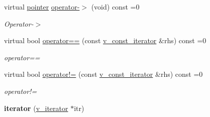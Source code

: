 \begin{DoxyCompactItemize}
\mbox{\label{group___thin_var_dep_interface___c_l_a_s_s_e_s_gab6b157ee55dad2dd8215f31aafbdd35f}} 
virtual \mbox{\hyperlink{class_s_m_spp__di__unipi__it_1_1_variable}{pointer}} \mbox{\hyperlink{group___thin_var_dep_interface___c_l_a_s_s_e_s_gab6b157ee55dad2dd8215f31aafbdd35f}{operator-\/$>$}} (void) const =0
\begin{DoxyCompactList}\small\item\em Operator-\/$>$ \end{DoxyCompactList}\item 
\mbox{\label{group___thin_var_dep_interface___c_l_a_s_s_e_s_gae057869085d3845118bd5cf033129e43}} 
virtual bool \mbox{\hyperlink{group___thin_var_dep_interface___c_l_a_s_s_e_s_gae057869085d3845118bd5cf033129e43}{operator==}} (const \mbox{\hyperlink{class_s_m_spp__di__unipi__it_1_1_thin_var_dep_interface_1_1v__const__iterator}{v\+\_\+const\+\_\+iterator}} \&rhs) const =0
\begin{DoxyCompactList}\small\item\em operator== \end{DoxyCompactList}\item 
\mbox{\label{group___thin_var_dep_interface___c_l_a_s_s_e_s_ga042a02e36885666d678408d678b499e7}} 
virtual bool \mbox{\hyperlink{group___thin_var_dep_interface___c_l_a_s_s_e_s_ga042a02e36885666d678408d678b499e7}{operator!=}} (const \mbox{\hyperlink{class_s_m_spp__di__unipi__it_1_1_thin_var_dep_interface_1_1v__const__iterator}{v\+\_\+const\+\_\+iterator}} \&rhs) const =0
\begin{DoxyCompactList}\small\item\em operator!= \end{DoxyCompactList}\item 
\mbox{\label{group___thin_var_dep_interface___c_l_a_s_s_e_s_ga772b10a992e1112b028069f463bd0a0f}} 
{\bfseries iterator} (\mbox{\hyperlink{class_s_m_spp__di__unipi__it_1_1_thin_var_dep_interface_1_1v__iterator}{v\+\_\+iterator}} $\ast$itr)
\item 
\mbox{\label{group___thin_var_dep_interface___c_l_a_s_s_e_s_gac476d3d079ac23a2fe8f67d6eaaa1e23}} 

\end{DoxyCompactItemize}
